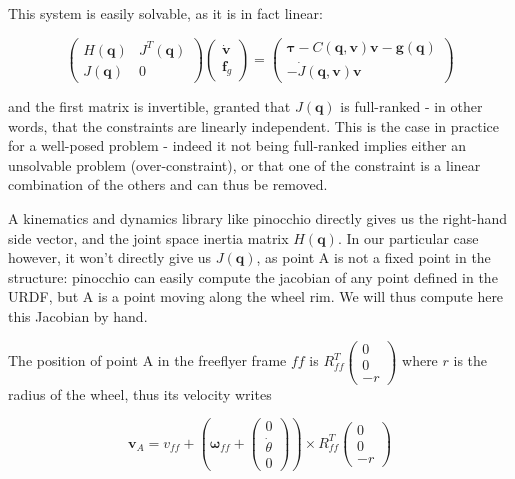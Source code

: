 \documentclass[a4paper,11pt]{article}
\begin{document}
This system is easily solvable, as it is in fact linear:

\begin{equation}
\begin{pmatrix} H(\bm q) & J^T(\bm q) \\ J(\bm q) & 0 \end{pmatrix} \begin{pmatrix} \dot{\bm v} \\ \bm f_g \end{pmatrix} = \begin{pmatrix} \bm \tau - C(\bm q, \bm v) \bm v - \bm g(\bm q) \\ -\dot{J}(\bm q, \bm v) \bm v \end{pmatrix}
\label{eqID}
\end{equation} 

and the first matrix is invertible, granted that $J(\bm q)$ is full-ranked - in other words, that the constraints are linearly independent. This is the case in practice for a well-posed problem - indeed it not being full-ranked implies either an unsolvable problem (over-constraint), or that one of the constraint is a linear combination of the others and can thus be removed.

\medskip

A kinematics and dynamics library like pinocchio directly gives us the right-hand side vector, and the joint space inertia matrix $H(\bm q)$. In our particular case however, it won't directly give us $J(\bm q)$, as point A is not a fixed point in the structure: pinocchio can easily compute the jacobian of any point defined in the URDF, but A is a point moving along the wheel rim. We will thus compute here this Jacobian by hand.

The position of point A in the freeflyer frame $ff$ is $R_{ff}^T \begin{pmatrix}0 \\ 0 \\ -r\end{pmatrix}$ where $r$ is the radius of the wheel, thus its velocity writes

\begin{equation}
\bm v_A = v_{ff} + (\bm \omega_{ff} + \begin{pmatrix}0 \\ \dot{\theta} \\ 0\end{pmatrix}) \times R_{ff}^T \begin{pmatrix}0 \\ 0 \\ -r\end{pmatrix}
\end{equation} 
\end{document}

